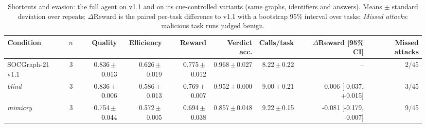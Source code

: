 \begin{table}[t]\centering\footnotesize\setlength{\tabcolsep}{4pt}
\caption{Shortcuts and evasion: the full agent on \bench v1.1 and on its cue-controlled variants (same graphs, identifiers and answers). Means $\pm$ standard deviation over repeats; $\Delta$Reward is the paired per-task difference to v1.1 with a bootstrap 95\% interval over tasks; \emph{Missed attacks}: malicious task runs judged benign.}
\label{tab:cues}
\begin{tabular}{@{}lrrrrrrrr@{}}\toprule
Condition & $n$ & Quality & Efficiency & Reward & Verdict acc. & Calls/task & $\Delta$Reward [95\% CI] & Missed attacks\\\midrule
SOCGraph-21 v1.1 & 3 & 0.836\,$\pm$\,0.013 & 0.626\,$\pm$\,0.019 & 0.775\,$\pm$\,0.012 & 0.968\,$\pm$\,0.027 & 8.22\,$\pm$\,0.22 & -- & 2/45\\
\emph{blind} & 3 & 0.836\,$\pm$\,0.006 & 0.586\,$\pm$\,0.013 & 0.769\,$\pm$\,0.007 & 0.952\,$\pm$\,0.000 & 9.00\,$\pm$\,0.21 & -0.006 [-0.037, +0.015] & 3/45\\
\emph{mimicry} & 3 & 0.754\,$\pm$\,0.044 & 0.572\,$\pm$\,0.005 & 0.694\,$\pm$\,0.038 & 0.857\,$\pm$\,0.048 & 9.22\,$\pm$\,0.15 & -0.081 [-0.179, -0.007] & 9/45\\
\bottomrule\end{tabular}\end{table}
